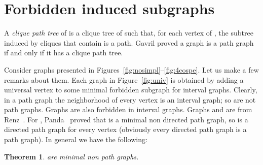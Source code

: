 \documentclass[11pt]{article}
\newtheorem{theorem}{Theorem}
\begin{document}
\section{Forbidden induced subgraphs}

A \emph{clique path tree}  of  is a clique tree of  such
that, for each vertex  of , the subtree  induced by cliques
that contain  is a path.  Gavril \cite{Gav78} proved a graph is a
path graph if and only if it has a clique path tree.

Consider graphs  presented in
Figures~\ref{fig:nosimpl}--\ref{fig:4cospe}.  Let us make a few
remarks about them.  Each graph in Figure~\ref{fig:univ} is obtained
by adding a universal vertex to some minimal forbidden subgraph for
interval graphs.  Clearly, in a path graph the neighborhood of every
vertex is an interval graph; so  are not path
graphs.  Graphs  are also forbidden in interval
graphs.  Graphs  and  are from Renz~\cite[Figures~1
and~5]{Ren70}.  For ,
Panda~\cite{Pan99} proved that  is a minimal non directed path
graph, so  is a directed path graph for every vertex
 (obviously every directed path graph is a path graph).  In general
we have the following:
\begin{theorem}
    \label{th:minimal}
     are minimal non path graphs.
\end{theorem}
\end{document}
